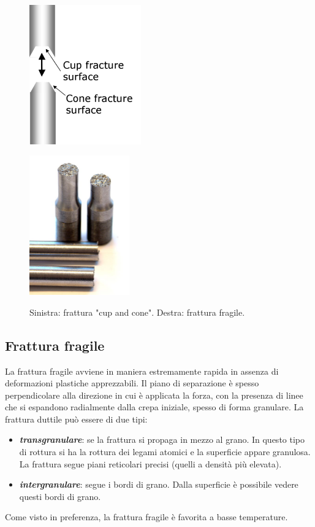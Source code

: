\begin{figure}[h]
    \begin{minipage}[b]{0.45\textwidth}
    
    \centering
    \includegraphics[height=6cm]{frattura/cup and cone.png}

    \label{cupcone}
    \end{minipage}
    \begin{minipage}[b]{0.45\textwidth}
    
    \centering
    \includegraphics[height=6cm]{frattura/brittle.png}
    \label{cupcone}
    \end{minipage}
    \caption{Sinistra: frattura "cup and cone". Destra: frattura fragile.}
\end{figure}

\subsection{Frattura fragile}

La frattura fragile avviene in maniera estremamente rapida in assenza di deformazioni plastiche apprezzabili. Il piano di separazione è spesso perpendicolare alla direzione in cui è applicata la forza, con la presenza di linee che si espandono radialmente dalla crepa iniziale, spesso di forma granulare. La frattura duttile può essere di due tipi: 
\begin{itemize}
    \item \textbf{\textit{transgranulare}}: se la frattura si propaga in mezzo al grano. In questo tipo di rottura si ha la rottura dei legami atomici e la superficie appare granulosa. La frattura segue piani reticolari precisi (quelli a densità più elevata).
    \item \textbf{\textit{intergranulare}}: segue i bordi di grano. Dalla superficie è possibile vedere questi bordi di grano.
\end{itemize}
Come visto in preferenza, la frattura fragile è favorita a basse temperature.

